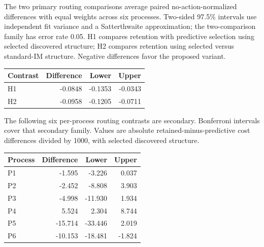 The two primary routing comparisons average paired no-action-normalized differences with equal weights across six processes. Two-sided 97.5\% intervals use independent fit variance and a Satterthwaite approximation; the two-comparison family has error rate 0.05. H1 compares retention with predictive selection using selected discovered structure; H2 compares retention using selected versus standard-IM structure. Negative differences favor the proposed variant.

\begin{center}\small\begin{tabular}{lrrr}\toprule

Contrast & Difference & Lower & Upper\\\midrule

H1 & -0.0848 & -0.1353 & -0.0343\\

H2 & -0.0958 & -0.1205 & -0.0711\\

\bottomrule\end{tabular}\end{center}

The following six per-process routing contrasts are secondary. Bonferroni intervals cover that secondary family. Values are absolute retained-minus-predictive cost differences divided by 1000, with selected discovered structure.

\begin{center}\small\begin{tabular}{lrrr}\toprule

Process & Difference & Lower & Upper\\\midrule

P1 & -1.595 & -3.226 & 0.037\\

P2 & -2.452 & -8.808 & 3.903\\

P3 & -4.998 & -11.930 & 1.934\\

P4 & 5.524 & 2.304 & 8.744\\

P5 & -15.714 & -33.446 & 2.019\\

P6 & -10.153 & -18.481 & -1.824\\

\bottomrule\end{tabular}\end{center}

